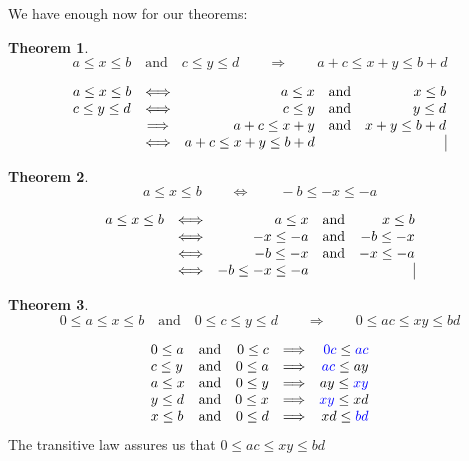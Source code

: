 \documentclass[twoside]{article}
\newtheorem{theorem}{Theorem}[section]
\newenvironment{proof}[1][Proof]{\begin{trivlist}
\item[\hskip \labelsep {\bfseries #1}]}{\end{trivlist}}
\newcommand{\qed}{\nobreak \ifvmode \relax \else
      \ifdim\lastskip<1.5em \hskip-\lastskip
      \hskip1.5em plus0em minus0.5em \fi \nobreak
      \vrule height0.5em width0.5em depth0.25em\fi}
\begin{document}
We have enough now for our theorems:

\begin{theorem}
\color{blue}
$$ a\le x\le b\quad\mbox{and}\quad c\le y\le d\qquad\Longrightarrow\qquad a+c\le x+y\le b+d $$
\end{theorem}

\begin{proof}
$$ \begin{array}{lcrrr}
a\le x\le b	&	\Longleftrightarrow	&	a\le x		&	\mbox{and}	&	x\le b		\\
c\le y\le d	&	\Longleftrightarrow	&	c\le y		&	\mbox{and}	&	y\le d		\\
		&	\Longrightarrow		&	a+c\le x+y	&	\mbox{and}	&	x+y\le b+d	\\
		&	\Longleftrightarrow	&	a+c\le x+y\le b+d	&		&	\qed		\\
\end{array} $$
\end{proof}

\begin{theorem}
\color{blue}
$$ a\le x\le b\qquad\Longleftrightarrow\qquad -b\le -x\le -a $$
\end{theorem}

\begin{proof}
$$ \begin{array}{lcrrr}
a\le x\le b	&	\Longleftrightarrow	&	a\le x		&	\mbox{and}	&	x\le b		\\
		&	\Longleftrightarrow	&	-x\le -a	&	\mbox{and}	&	-b\le -x	\\
		&	\Longleftrightarrow	&	-b\le -x	&	\mbox{and}	&	-x\le -a	\\
		&	\Longleftrightarrow	&	-b\le -x\le -a	&			&	\qed		\\
\end{array} $$
\end{proof}

\newpage

\begin{theorem}
\color{blue}
$$ 0\le a\le x\le b\quad\mbox{and}\quad 0\le c\le y\le d\qquad\Longrightarrow\qquad 0\le ac\le xy\le bd $$
\end{theorem}

\begin{proof}
$$ \begin{array}{lcrrr}
0\le a	&	\mbox{and}	&	0\le c	& \Longrightarrow	&	\textcolor{blue}{0c}\le\textcolor{blue}{ac}	\\
c\le y	&	\mbox{and}	&	0\le a	& \Longrightarrow	&	\textcolor{blue}{ac}\le ay			\\
a\le x	&	\mbox{and}	&	0\le y	& \Longrightarrow	&	ay\le\textcolor{blue}{xy}			\\
y\le d	&	\mbox{and}	&	0\le x	& \Longrightarrow	&	\textcolor{blue}{xy}\le xd			\\
x\le b	&	\mbox{and}	&	0\le d	& \Longrightarrow	&	xd\le \textcolor{blue}{bd}			\\
\end{array} $$
The transitive law assures us that $ 0\le ac\le xy\le bd $\qed
\end{proof}
\end{document}
